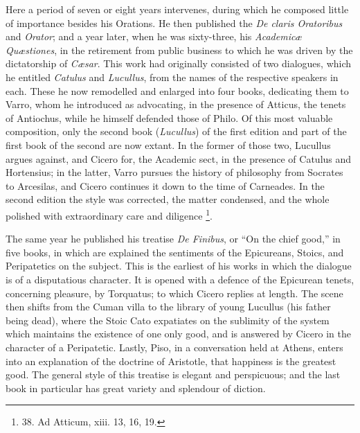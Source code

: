 Here a period of seven or
eight years intervenes, during which he composed little of importance
besides his Orations. He then published the \emph{De claris Oratoribus}
and \emph{Orator}; and a year later, when he was sixty-three, his \emph{Academicæ
Quæstiones}, in the retirement from public business to which he
was driven by the dictatorship of \emph{Cæsar}. This work had
originally consisted of two dialogues, which he entitled \emph{Catulus}
and \emph{Lucullus}, from the names of the respective speakers in
each. These he now remodelled and enlarged into four books, dedicating
them to Varro, whom he introduced as advocating, in the presence of
Atticus, the tenets of Antiochus, while he himself defended those of
Philo. Of this most valuable composition, only the second book (\emph{Lucullus})
of the first edition and part of the first book of the second are now
extant. In the former of those two, Lucullus argues against, and
Cicero for, the Academic sect, in the presence of Catulus and
Hortensius; in the latter, Varro pursues the history of philosophy
from Socrates to Arcesilas, and Cicero continues it down to the time
of Carneades. In the second edition the style was corrected, the
matter condensed, and the whole polished with extraordinary care and
diligence \footnote{38. Ad Atticum, xiii. 13, 16,
19.}.

The same year he published his
treatise \emph{De Finibus}, or ``On the chief good,'' in five books,
in which are explained the sentiments of the Epicureans, Stoics, and
Peripatetics on the subject. This is the earliest of his works in
which the dialogue is of a disputatious character. It is opened with a
defence of the Epicurean tenets, concerning pleasure, by Torquatus; to
which Cicero replies at length. The scene then shifts from the Cuman
villa to the library of young Lucullus (his father being dead), where
the Stoic Cato expatiates on the sublimity of the system which
maintains the existence of one only good, and is answered by Cicero in
the character of a Peripatetic. Lastly, Piso, in a conversation held
at Athens, enters into an explanation of the doctrine of Aristotle,
that happiness is the greatest good. The general style of this
treatise is elegant and perspicuous; and the last book in particular
has great variety and splendour of diction.

